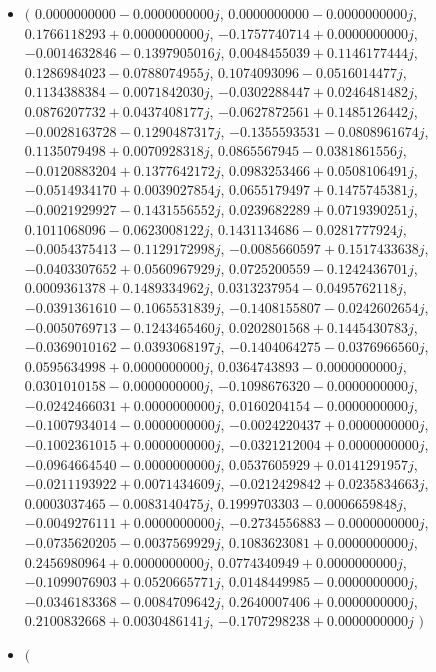 \documentclass[14pt,a4paper]{article}
\begin{document}
\begin{itemize}
\item
$\big($
$0.0000000000-0.0000000000j$, $0.0000000000-0.0000000000j$, $0.1766118293+0.0000000000j$, $-0.1757740714+0.0000000000j$, $-0.0014632846-0.1397905016j$, $0.0048455039+0.1146177444j$, $0.1286984023-0.0788074955j$, $0.1074093096-0.0516014477j$, $0.1134388384-0.0071842030j$, $-0.0302288447+0.0246481482j$, $0.0876207732+0.0437408177j$, $-0.0627872561+0.1485126442j$, $-0.0028163728-0.1290487317j$, $-0.1355593531-0.0808961674j$, $0.1135079498+0.0070928318j$, $0.0865567945-0.0381861556j$, $-0.0120883204+0.1377642172j$, $0.0983253466+0.0508106491j$, $-0.0514934170+0.0039027854j$, $0.0655179497+0.1475745381j$, $-0.0021929927-0.1431556552j$, $0.0239682289+0.0719390251j$, $0.1011068096-0.0623008122j$, $0.1431134686-0.0281777924j$, $-0.0054375413-0.1129172998j$, $-0.0085660597+0.1517433638j$, $-0.0403307652+0.0560967929j$, $0.0725200559-0.1242436701j$, $0.0009361378+0.1489334962j$, $0.0313237954-0.0495762118j$, $-0.0391361610-0.1065531839j$, $-0.1408155807-0.0242602654j$, $-0.0050769713-0.1243465460j$, $0.0202801568+0.1445430783j$, $-0.0369010162-0.0393068197j$, $-0.1404064275-0.0376966560j$, $0.0595634998+0.0000000000j$, $0.0364743893-0.0000000000j$, $0.0301010158-0.0000000000j$, $-0.1098676320-0.0000000000j$, $-0.0242466031+0.0000000000j$, $0.0160204154-0.0000000000j$, $-0.1007934014-0.0000000000j$, $-0.0024220437+0.0000000000j$, $-0.1002361015+0.0000000000j$, $-0.0321212004+0.0000000000j$, $-0.0964664540-0.0000000000j$, $0.0537605929+0.0141291957j$, $-0.0211193922+0.0071434609j$, $-0.0212429842+0.0235834663j$, $0.0003037465-0.0083140475j$, $0.1999703303-0.0006659848j$, $-0.0049276111+0.0000000000j$, $-0.2734556883-0.0000000000j$, $-0.0735620205-0.0037569929j$, $0.1083623081+0.0000000000j$, $0.2456980964+0.0000000000j$, $0.0774340949+0.0000000000j$, $-0.1099076903+0.0520665771j$, $0.0148449985-0.0000000000j$, $-0.0346183368-0.0084709642j$, $0.2640007406+0.0000000000j$, $0.2100832668+0.0030486141j$, $-0.1707298238+0.0000000000j$
$\big)$
\item
$\big($

\end{itemize}
\end{document}

